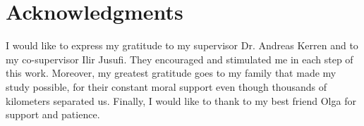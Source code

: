 \section*{Acknowledgments}
\label{sec:acknowledgments}

I would like to express my gratitude to my supervisor Dr. Andreas Kerren and to my co-supervisor Ilir Jusufi. They encouraged and stimulated me in each step of this work. Moreover, my greatest gratitude goes to my family that made my study possible, for their constant moral support even though thousands of kilometers separated us. Finally, I would like to thank to my best friend Olga for support and patience.